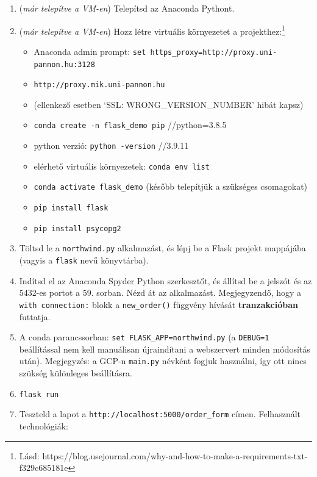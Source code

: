 \documentclass[
  magyar,
]{article}
\providecommand{\tightlist}{%
  \setlength{\itemsep}{0pt}\setlength{\parskip}{0pt}}
\begin{document}
\begin{enumerate}
\def\labelenumi{\arabic{enumi}.}
\item
  (\emph{már telepítve a VM-en}) Telepítsd az Anaconda Pythont.
\item
  (\emph{már telepítve a VM-en}) Hozz létre virtuális környezetet a
  projekthez:\footnote{Lásd:
    https://blog.usejournal.com/why-and-how-to-make-a-requirements-txt-f329c685181e}

  \begin{itemize}
  \tightlist
  \item
    Anaconda admin prompt:
    \texttt{set\ https\_proxy=http://proxy.uni-pannon.hu:3128}
  \item
    \texttt{http://proxy.mik.uni-pannon.hu}
  \item
    (ellenkező esetben `SSL: WRONG\_VERSION\_NUMBER' hibát kapsz)
  \item
    \texttt{conda\ create\ -n\ flask\_demo\ pip} //python=3.8.5
  \item
    python verzió: \texttt{python\ -version} //3.9.11
  \item
    elérhető virtuális környezetek: \texttt{conda\ env\ list}
  \item
    \texttt{conda\ activate\ flask\_demo} (később telepítjük a szükséges
    csomagokat)
  \item
    \texttt{pip\ install\ flask}
  \item
    \texttt{pip\ install\ psycopg2}
  \end{itemize}
\item
  Töltsd le a \texttt{northwind.py} alkalmazást, és lépj be a Flask
  projekt mappájába (vagyis a \texttt{flask} nevű könyvtárba).
\item
  Indítsd el az Anaconda Spyder Python szerkesztőt, és állítsd be a
  jelszót és az 5432-es portot a 59. sorban. Nézd át az alkalmazást.
  Megjegyzendő, hogy a \texttt{with\ connection:} blokk a
  \texttt{new\_order()} függvény hívását \textbf{tranzakcióban}
  futtatja.
\item
  A conda parancssorban: \texttt{set\ FLASK\_APP=northwind.py} (a
  \texttt{DEBUG=1} beállítással nem kell manuálisan újraindítani a
  webszervert minden módosítás után). Megjegyzés: a GCP-n
  \texttt{main.py} névként fogjuk használni, így ott nincs szükség
  különleges beállításra.
\item
  \texttt{flask\ run}
\item
  Teszteld a lapot a \texttt{http://localhost:5000/order\_form} címen.
  Felhasznált technológiák:


\end{enumerate}
\end{document}
